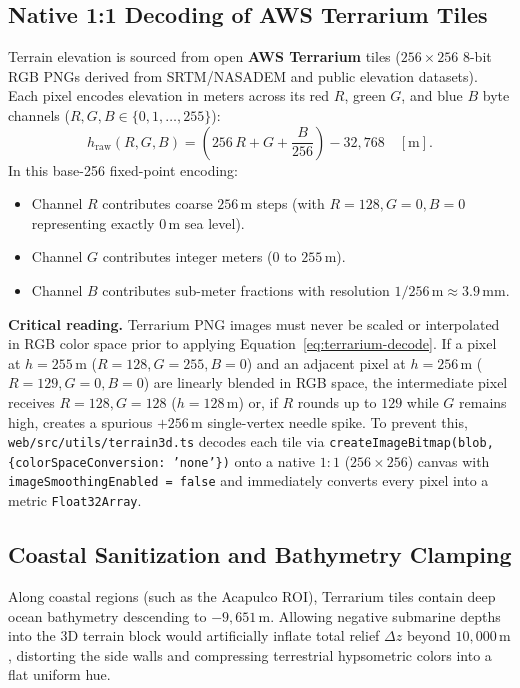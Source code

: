 \documentclass[11pt,a4paper]{article}
\newcommand{\src}[1]{\nolinkurl{#1}}
\newcommand{\unit}[1]{\mathrm{#1}}
\newcommand{\warn}[1]{\par\noindent\colorbox{blue!8}{\parbox{.965\linewidth}{\textbf{Critical reading.} #1}}\par}
\begin{document}
\subsection{Native 1:1 Decoding of AWS Terrarium Tiles}
\label{sec:relieve3d-terrarium}

Terrain elevation is sourced from open \textbf{AWS Terrarium} tiles ($256\times256$ 8-bit RGB PNGs derived from SRTM/NASADEM and public elevation datasets). Each pixel encodes elevation in meters across its red $R$, green $G$, and blue $B$ byte channels ($R,G,B\in\{0,1,\ldots,255\}$):
\begin{equation}
  h_{\mathrm{raw}}(R,G,B) = \left(256\,R + G + \frac{B}{256}\right) - 32,768\quad[\unit{m}].
  \label{eq:terrarium-decode}
\end{equation}
In this base-256 fixed-point encoding:
\begin{itemize}
  \item Channel $R$ contributes coarse $256\,\unit{m}$ steps (with $R=128, G=0, B=0$ representing exactly $0\,\unit{m}$ sea level).
  \item Channel $G$ contributes integer meters ($0$ to $255\,\unit{m}$).
  \item Channel $B$ contributes sub-meter fractions with resolution $1/256\,\unit{m}\approx 3.9\,\unit{mm}$.
\end{itemize}

\warn{Terrarium PNG images must never be scaled or interpolated in RGB color space prior to applying Equation~\eqref{eq:terrarium-decode}. If a pixel at $h=255\,\unit{m}$ ($R=128,G=255,B=0$) and an adjacent pixel at $h=256\,\unit{m}$ ($R=129,G=0,B=0$) are linearly blended in RGB space, the intermediate pixel receives $R=128,G=128$ ($h=128\,\unit{m}$) or, if $R$ rounds up to $129$ while $G$ remains high, creates a spurious $+256\,\unit{m}$ single-vertex needle spike. To prevent this, \src{web/src/utils/terrain3d.ts} decodes each tile via \texttt{createImageBitmap(blob, \{colorSpaceConversion: 'none'\})} onto a native $1:1$ ($256\times256$) canvas with \texttt{imageSmoothingEnabled = false} and immediately converts every pixel into a metric \texttt{Float32Array}.}

\subsection{Coastal Sanitization and Bathymetry Clamping}
\label{sec:relieve3d-saneamiento}

Along coastal regions (such as the Acapulco ROI), Terrarium tiles contain deep ocean bathymetry descending to $-9,651\,\unit{m}$. Allowing negative submarine depths into the 3D terrain block would artificially inflate total relief $\Delta z$ beyond $10,000\,\unit{m}$, distorting the side walls and compressing terrestrial hypsometric colors into a flat uniform hue.
\end{document}
